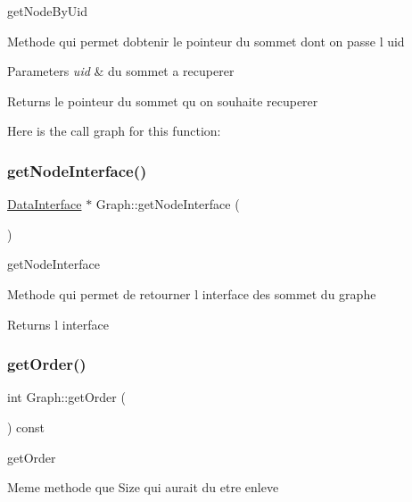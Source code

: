 get\+Node\+By\+Uid 

Methode qui permet d\textquotesingle{}obtenir le pointeur du sommet dont on passe l uid


\begin{DoxyParams}{Parameters}
{\em uid} & du sommet a recuperer \\
\hline
\end{DoxyParams}
\begin{DoxyReturn}{Returns}
le pointeur du sommet qu on souhaite recuperer 
\end{DoxyReturn}
Here is the call graph for this function\+:
\mbox{\label{class_graph_a69e269c872eb3f1cf9d1c941d3e30861}} 
\subsubsection{\texorpdfstring{get\+Node\+Interface()}{getNodeInterface()}}
{\footnotesize\ttfamily \mbox{\hyperlink{struct_data_interface}{Data\+Interface}} $\ast$ Graph\+::get\+Node\+Interface (\begin{DoxyParamCaption}{ }\end{DoxyParamCaption})}



get\+Node\+Interface 

Methode qui permet de retourner l interface des sommet du graphe

\begin{DoxyReturn}{Returns}
l interface 
\end{DoxyReturn}
\mbox{\label{class_graph_a4edd61cf5268a3d467dafa9867376546}} 
\subsubsection{\texorpdfstring{get\+Order()}{getOrder()}}
{\footnotesize\ttfamily int Graph\+::get\+Order (\begin{DoxyParamCaption}{ }\end{DoxyParamCaption}) const}



get\+Order 

Meme methode que Size qui aurait du etre enleve \mbox{\label{class_graph_a45c6a79b3251a56674cbabf980f8cea7}} 

